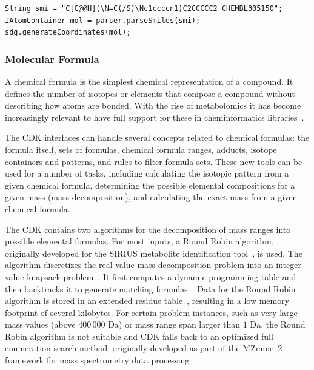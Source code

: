 \documentclass[doublespacing]{bmcart}
\begin{document}
\vspace{0.2cm}
\begin{verbatim}
String smi = "C[C@@H](\N=C(/S)\Nc1ccccn1)C2CCCCC2 CHEMBL305150";
IAtomContainer mol = parser.parseSmiles(smi);
sdg.generateCoordinates(mol);
\end{verbatim}
\vspace{0.2cm}

 \subsubsection*{Molecular Formula}

A chemical formula is the simplest chemical representation of a
compound.  It defines the number of isotopes or elements that
compose  a compound without describing how atoms
are bonded. With the rise of metabolomics it has become increasingly
relevant to have full support for these in cheminformatics
libraries~\cite{Wolf2010,RojasCherto2011,Pluskal2012,Pluskal2010,Duhrkop2015}.

The CDK interfaces can handle several concepts related to chemical formulas:
the formula itself, sets of formulas, chemical formula ranges, adducts, isotope
containers and patterns, and rules to filter formula sets. These new tools can
be used for a number of tasks, including calculating the isotopic pattern from
a given chemical formula, determining the possible elemental compositions for a
given mass (mass decomposition), and calculating the exact mass from a given
chemical formula.

The CDK contains two algorithms for the decomposition of mass ranges into
possible elemental formulas. For most inputs, a Round Robin algorithm,
originally developed for the SIRIUS metabolite identification
tool~\cite{Bocker2009}, is used. The algorithm discretizes the real-value mass
decomposition problem into an integer-value knapsack
problem~\cite{Martello1990}. It first computes a dynamic programming table and
then backtracks it to generate matching formulas~\cite{Duehrkop2013,
Boecker2008}. Data for the Round Robin algorithm is stored in an extended
residue table~\cite{Bocker2005}, resulting in a low memory footprint of several
kilobytes. For certain problem instances, such as very large mass values (above
$400\,000$ Da) or mass range span larger than $1$ Da, the Round Robin algorithm
is not suitable and CDK falls back to an optimized full enumeration search
method, originally developed as part of the MZmine~2 framework for mass
spectrometry data processing~\cite{Pluskal2012, Pluskal2010}.
\end{document}
